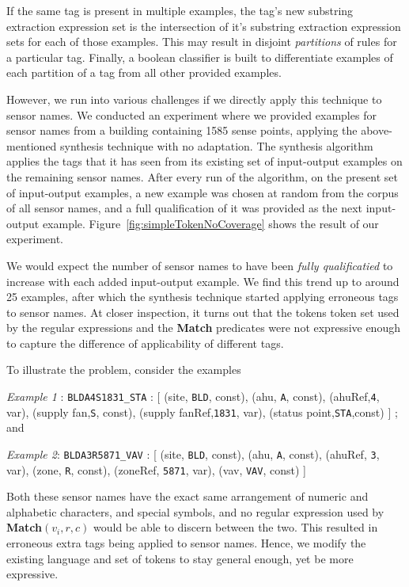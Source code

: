 If the same tag is present in multiple examples, the tag's new substring extraction expression set is the intersection of it's substring extraction expression sets for each of those examples. This may result in disjoint {\it partitions} of rules for a particular tag. Finally, a boolean classifier is built to differentiate examples of each partition of a tag from all other provided examples. 

However, we run into various challenges if we directly apply this technique to sensor names. We conducted an experiment where we provided examples for sensor names from a building containing 1585 sense points, applying the above-mentioned synthesis technique with no adaptation. The synthesis algorithm applies the tags that it has seen from its existing set of input-output examples on the remaining sensor names. After every run of the algorithm,  on the present set of input-output examples, a new example was chosen at random from the corpus of all sensor names, and a full qualification of it was provided as the next input-output example. Figure~\ref{fig:simpleTokenNoCoverage} shows the result of our experiment.


We would expect the number of sensor names to have been {\it fully qualificatied} to increase with each added input-output example. We find this trend up to around 25 examples, after which the synthesis technique started applying erroneous tags to sensor names. At closer inspection, it turns out that the tokens token set used by the regular expressions and the {\bf Match} predicates were not expressive enough to capture the difference of applicability of different tags. 

To illustrate the problem, consider the examples 

{\it Example 1} : \texttt{BLDA4S1831\_STA} : [ (site, \texttt{BLD}, const), (ahu, \texttt{A}, const), (ahuRef,\texttt{4}, var), (supply fan,\texttt{S}, const), (supply fanRef,\texttt{1831}, var), (status point,\texttt{STA},const) ] ; and 

{\it Example 2}: \texttt{BLDA3R5871\_VAV} : [ (site, \texttt{BLD}, const), (ahu, \texttt{A}, const), (ahuRef, \texttt{3}, var), (zone, \texttt{R}, const), (zoneRef, \texttt{5871}, var), (vav, \texttt{VAV}, const) ]

Both these sensor names have the exact same arrangement of numeric and alphabetic characters, and special symbols, and no regular expression used by {\bf Match}$(v_i,r,c)$  would be able to discern between the two. This resulted in erroneous extra tags being applied to sensor names. Hence, we modify the existing language and set of tokens to stay general enough, yet be more expressive. \\

